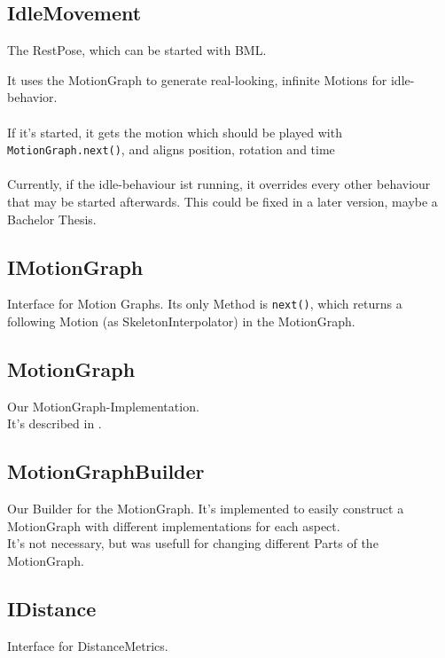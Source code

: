 \documentclass[a4paper,10pt,titlepage,bibliography=totocnumbered]{scrartcl}
\begin{document}
\subsection{IdleMovement}

The RestPose, which can be started with BML.

It uses the MotionGraph to generate real-looking, infinite Motions for idle-behavior.
\\\\
If it's started, it gets the motion which should be played with \lstinline[]{MotionGraph.next()}, and aligns position, rotation and time
\\\\
Currently, if the idle-behaviour ist running, it overrides every other behaviour that may be started afterwards. This could be fixed in a later version, maybe a Bachelor Thesis.

\subsection{IMotionGraph}

Interface for Motion Graphs.
Its only Method is \lstinline[]{next()}, which returns a following Motion (as SkeletonInterpolator) in the MotionGraph.

\subsection{MotionGraph}

Our MotionGraph-Implementation.
\\
It's described in .

\subsection{MotionGraphBuilder}

Our Builder for the MotionGraph. It's implemented to easily construct a MotionGraph with different implementations for each aspect.
\\
It's not necessary, but was usefull for changing different Parts of the MotionGraph.

\subsection{IDistance}

Interface for DistanceMetrics.
\end{document}

